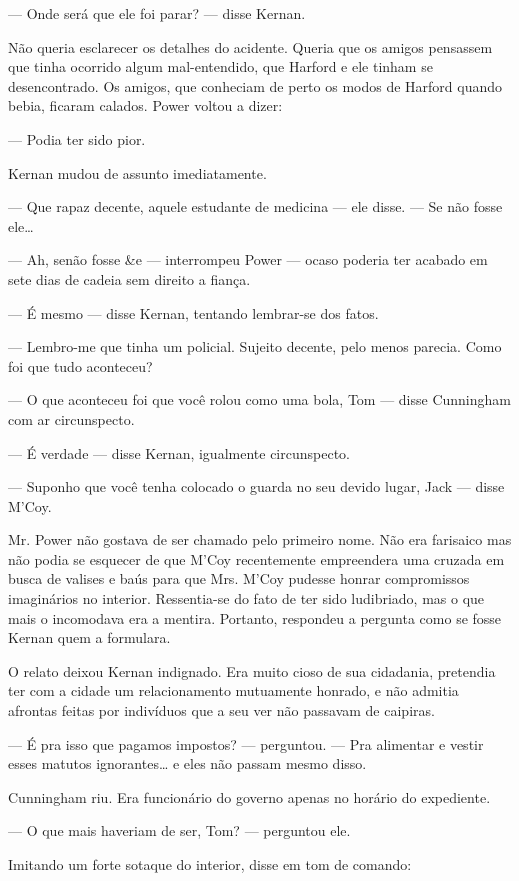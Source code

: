 --- Onde será que ele foi parar? --- disse Kernan.

Não queria esclarecer os detalhes do acidente. Queria que os amigos
pensassem que tinha ocorrido algum mal-entendido, que Harford e ele
tinham se desencontrado. Os amigos, que conheciam de perto os modos
de Harford quando bebia, ficaram calados. Power voltou a dizer:

--- Podia ter sido pior.

Kernan mudou de assunto imediatamente.

--- Que rapaz decente, aquele estudante de medicina --- ele disse. ---
Se não fosse ele\ldots{}

--- Ah, senão fosse \&e --- interrompeu Power --- ocaso poderia ter
acabado em sete dias de cadeia sem direito a fiança.

--- É mesmo --- disse Kernan, tentando lembrar-se dos fatos.

--- Lembro-me que tinha um policial. Sujeito decente, pelo menos
parecia. Como foi que tudo aconteceu?

--- O que aconteceu foi que você rolou como uma bola, Tom --- disse
Cunningham com ar circunspecto.

--- É verdade --- disse Kernan, igualmente circunspecto.

--- Suponho que você tenha colocado o guarda no seu devido lugar, Jack
--- disse M'Coy.

Mr. Power não gostava de ser chamado pelo primeiro nome. Não era
farisaico mas não podia se esquecer de que M'Coy recentemente
empreendera uma cruzada em busca de valises e baús para que Mrs. M'Coy
pudesse honrar compromissos imaginários no interior. Ressentia-se do
fato de ter sido ludibriado, mas o que
mais o incomodava era a mentira. Portanto, respondeu a pergunta como
se fosse Kernan quem a formulara.

O relato deixou Kernan indignado. Era muito cioso de sua cidadania,
pretendia ter com a cidade um relacionamento mutuamente honrado, e
não admitia afrontas feitas por indivíduos que a seu ver não passavam
de caipiras.

--- É pra isso que pagamos impostos? --- perguntou. --- Pra alimentar
e vestir esses matutos ignorantes\ldots{} e eles não passam mesmo disso.

Cunningham riu. Era funcionário do governo apenas no horário do
expediente.

--- O que mais haveriam de ser, Tom? --- perguntou ele.

Imitando um forte sotaque do interior, disse em tom de comando:


